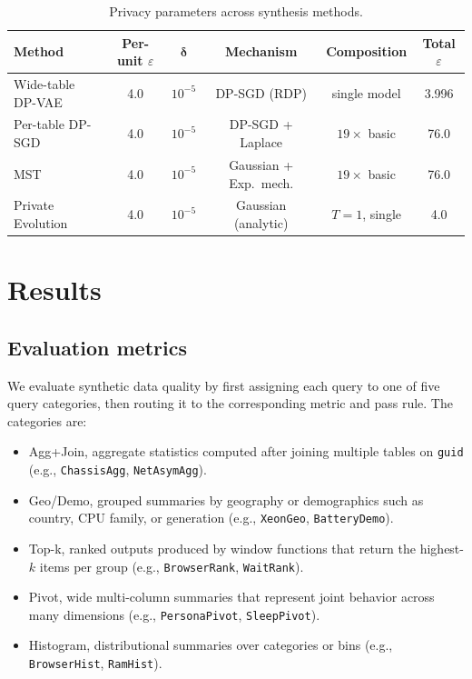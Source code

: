 \documentclass[12pt,letterpaper]{article}
\renewcommand{\_}{\textunderscore\allowbreak}
\begin{document}
\begin{table}[H]
\centering
\small
\begin{tabular*}{\textwidth}{@{\extracolsep{\fill}}lccccc}
\toprule
\textbf{Method} & \textbf{Per-unit $\varepsilon$} & $\boldsymbol{\delta}$ & \textbf{Mechanism} & \textbf{Composition} & \textbf{Total $\varepsilon$} \\
\midrule
Wide-table DP-VAE & 4.0 & $10^{-5}$ & DP-SGD (RDP) & single model & 3.996 \\
Per-table DP-SGD & 4.0 & $10^{-5}$ & DP-SGD + Laplace & $19\times$ basic & 76.0 \\
MST & 4.0 & $10^{-5}$ & Gaussian + Exp.\ mech. & $19\times$ basic & 76.0 \\
Private Evolution & 4.0 & $10^{-5}$ & Gaussian (analytic) & $T{=}1$, single & 4.0 \\
\bottomrule
\end{tabular*}
\caption{Privacy parameters across synthesis methods.}
\label{tab:privacy-params}
\end{table}

\newpage

\section{Results}

\subsection{Evaluation metrics}

We evaluate synthetic data quality by first assigning each query to one of five query categories, then routing it to the corresponding metric and pass rule. The categories are:
\begin{itemize}
    \item Agg+Join, aggregate statistics computed after joining multiple tables on \texttt{guid} (e.g., \texttt{ChassisAgg}, \texttt{NetAsymAgg}).
    \item Geo/Demo, grouped summaries by geography or demographics such as country, CPU family, or generation (e.g., \texttt{XeonGeo}, \texttt{BatteryDemo}).
    \item Top-k, ranked outputs produced by window functions that return the highest-$k$ items per group (e.g., \texttt{BrowserRank}, \texttt{WaitRank}).
    \item Pivot, wide multi-column summaries that represent joint behavior across many dimensions (e.g., \texttt{PersonaPivot}, \texttt{SleepPivot}).
    \item Histogram, distributional summaries over categories or bins (e.g., \texttt{BrowserHist}, \texttt{RamHist}).
\end{itemize}
\end{document}
